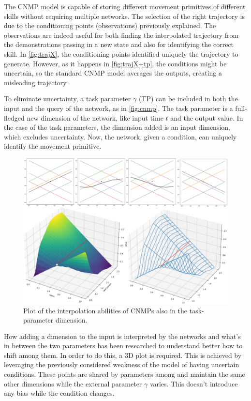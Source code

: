 The CNMP model is capable of storing different movement primitives of different skills without requiring multiple networks. The selection of the right trajectory is due to the conditioning points (observations) previously explained. The observations are indeed useful for both finding the interpolated trajectory from the demonstrations passing in a new state and also for identifying the correct skill. In \cref{fig:trajX}, the conditioning points identified uniquely the trajectory to generate. However, as it happens in \cref{fig:trajX+tp}, the conditions might be uncertain, so the standard CNMP model averages the outputs, creating a misleading trajectory. 

To eliminate uncertainty, a task parameter $\gamma$ (TP) can be included in both the input and the query of the network, as in \cref{fig:cnmp}. The task parameter is a full-fledged new dimension of the network, like input time $t$ and the output value. In the case of the task parameters, the dimension added is an input dimension, which excludes uncertainty. Now, the network, given a condition, can uniquely identify the movement primitive.
\begin{figure}
    \centering
    \includegraphics[width=0.9\linewidth]{figures/graph-tp-dimension.jpg}
    \caption{ Plot of the interpolation abilities of CNMPs also in the task-parameter dimension. }
    \label{fig:graph-tp-transition}
\end{figure}
 
How adding a dimension to the input is interpreted by the networks and what's in between the two parameters has been researched to understand better how to shift among them. In order to do this, a 3D plot is required. This is achieved by leveraging the previously considered weakness of the model of having uncertain conditions. These points are shared by parameters among and maintain the same other dimensions while the external parameter $\gamma$ varies. This doesn't introduce any bias while the condition changes. 

